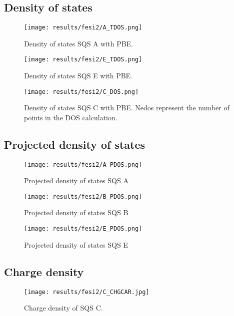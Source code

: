 \chapter{}
\label{appendix:equi}

\section{Density of states}

\begin{figure}[H]
	\centering
	\texttt{[image: results/fesi2/A\_TDOS.png]}
	\caption{Density of states SQS A  with PBE.}
\end{figure}

\begin{figure}[H]
	\centering
	\texttt{[image: results/fesi2/E\_TDOS.png]}
	\caption{Density of states SQS E  with PBE.}
\end{figure}

\begin{figure}[H]
	\centering
	\texttt{[image: results/fesi2/C\_DOS.png]}
	\caption{Density of states SQS C  with PBE. Nedos represent the number of points in the DOS calculation.}
\end{figure}


\section{Projected density of states}

\begin{figure}[H]
\texttt{[image: results/fesi2/A\_PDOS.png]}
\caption{Projected density of states SQS A}
\end{figure}

\begin{figure}[H]
\texttt{[image: results/fesi2/B\_PDOS.png]}
\caption{Projected density of states SQS B}
\end{figure}

\begin{figure}[H]
\texttt{[image: results/fesi2/E\_PDOS.png]}
\caption{Projected density of states SQS E}
\end{figure}

\section{Charge density}

\begin{figure}[H]
\texttt{[image: results/fesi2/C\_CHGCAR.jpg]}
\caption{Charge density of SQS C.}
\end{figure}
